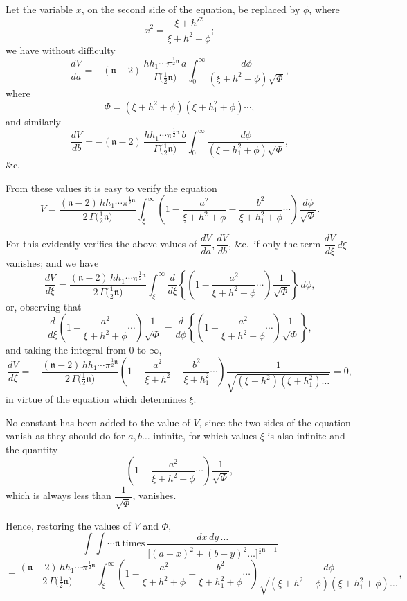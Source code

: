 \documentclass[11pt]{article}
\begin{document}
\clearpage

Let the variable $x$, on the second side of the equation, be replaced by $\phi$, where
\[
x^{2} = \frac{\xi + h'^{2}}{\xi + h^{2} + \phi};
\]
we have without difficulty
\[
\frac{dV}{da} = -(\mathfrak{n} - 2)\,\frac{hh_{1}\cdots\pi^{\frac{1}{2}\mathfrak{n}}\,a}{\Gamma\bigl(\tfrac{1}{2}\mathfrak{n}\bigr)}\int_{0}^{\infty}\frac{d\phi}{(\xi + h^{2} + \phi)\sqrt{\Phi}},
\]
where
\[
\Phi = (\xi + h^{2} + \phi)(\xi + h_{1}^{2} + \phi)\cdots,
\]
and similarly
\[
\frac{dV}{db} = -(\mathfrak{n} - 2)\,\frac{hh_{1}\cdots\pi^{\frac{1}{2}\mathfrak{n}}\,b}{\Gamma\bigl(\tfrac{1}{2}\mathfrak{n}\bigr)}\int_{0}^{\infty}\frac{d\phi}{(\xi + h_{1}^{2} + \phi)\sqrt{\Phi}},
\]
\&c.

From these values it is easy to verify the equation
\[
V = \frac{(\mathfrak{n} - 2)\,hh_{1}\cdots\pi^{\frac{1}{2}\mathfrak{n}}}{2\,\Gamma\bigl(\tfrac{1}{2}\mathfrak{n}\bigr)}\int_{\xi}^{\infty}\left(1 - \frac{a^{2}}{\xi + h^{2} + \phi} - \frac{b^{2}}{\xi + h_{1}^{2} + \phi}\cdots\right)\frac{d\phi}{\sqrt{\Phi}}.
\]

For this evidently verifies the above values of $\dfrac{dV}{da}, \dfrac{dV}{db}$, \&c.\ if only the term $\dfrac{dV}{d\xi}\,d\xi$ vanishes; and we have
\[
\frac{dV}{d\xi} = \frac{(\mathfrak{n} - 2)\,hh_{1}\cdots\pi^{\frac{1}{2}\mathfrak{n}}}{2\,\Gamma\bigl(\tfrac{1}{2}\mathfrak{n}\bigr)}\int_{\xi}^{\infty}\frac{d}{d\xi}\left\{\left(1 - \frac{a^{2}}{\xi + h^{2} + \phi}\cdots\right)\frac{1}{\sqrt{\Phi}}\right\}\,d\phi,
\]
or, observing that
\[
\frac{d}{d\xi}\left(1 - \frac{a^{2}}{\xi + h^{2} + \phi}\cdots\right)\frac{1}{\sqrt{\Phi}} = \frac{d}{d\phi}\left\{\left(1 - \frac{a^{2}}{\xi + h^{2} + \phi}\cdots\right)\frac{1}{\sqrt{\Phi}}\right\},
\]
and taking the integral from $0$ to $\infty$,
\[
\frac{dV}{d\xi} = -\,\frac{(\mathfrak{n} - 2)\,hh_{1}\cdots\pi^{\frac{1}{2}\mathfrak{n}}}{2\,\Gamma\bigl(\tfrac{1}{2}\mathfrak{n}\bigr)}\left(1 - \frac{a^{2}}{\xi + h^{2}} - \frac{b^{2}}{\xi + h_{1}^{2}}\cdots\right)\frac{1}{\sqrt{(\xi + h^{2})(\xi + h_{1}^{2})\ldots}} = 0,
\]
in virtue of the equation which determines $\xi$.

No constant has been added to the value of $V$, since the two sides of the equation vanish as they should do for $a, b \ldots$ infinite, for which values $\xi$ is also infinite and the quantity
\[
\left(1 - \frac{a^{2}}{\xi + h^{2} + \phi}\cdots\right)\frac{1}{\sqrt{\Phi}},
\]
which is always less than $\dfrac{1}{\sqrt{\Phi}}$, vanishes.

Hence, restoring the values of $V$ and $\Phi$,
\[
\int\!\!\int \cdots \mathfrak{n}\ \text{times}\ \frac{dx\,dy\,\ldots}{\bigl[(a - x)^{2} + (b - y)^{2}\ldots\bigr]^{\frac{1}{2}\mathfrak{n} - 1}}
\]
\[
= \frac{(\mathfrak{n} - 2)\,hh_{1}\cdots\pi^{\frac{1}{2}\mathfrak{n}}}{2\,\Gamma\bigl(\tfrac{1}{2}\mathfrak{n}\bigr)}\int_{\xi}^{\infty}\left(1 - \frac{a^{2}}{\xi + h^{2} + \phi} - \frac{b^{2}}{\xi + h_{1}^{2} + \phi}\cdots\right)\frac{d\phi}{\sqrt{(\xi + h^{2} + \phi)(\xi + h_{1}^{2} + \phi)\ldots}},
\]
\end{document}
